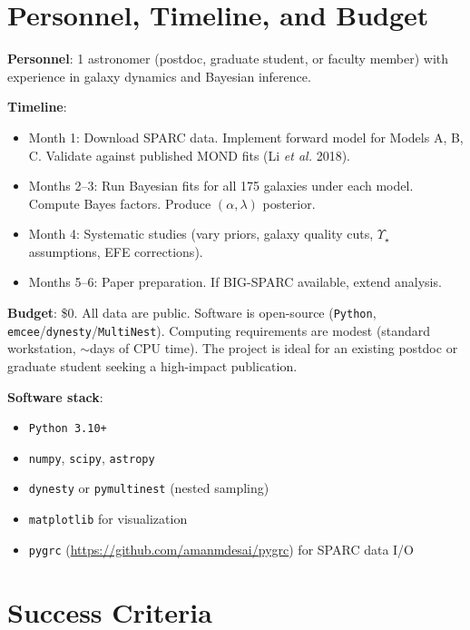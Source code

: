 \documentclass[11pt]{article}
\begin{document}
\section{Personnel, Timeline, and Budget}

\textbf{Personnel}: 1 astronomer (postdoc, graduate student, or faculty
member) with experience in galaxy dynamics and Bayesian inference.

\textbf{Timeline}:
\begin{itemize}[nosep]
\item Month 1: Download SPARC data. Implement forward model for
  Models A, B, C. Validate against published MOND fits
  (Li \textit{et al.} 2018).
\item Months 2--3: Run Bayesian fits for all 175 galaxies under each
  model. Compute Bayes factors. Produce $(\alpha, \lambda)$ posterior.
\item Month 4: Systematic studies (vary priors, galaxy quality cuts,
  $\Upsilon_\star$ assumptions, EFE corrections).
\item Months 5--6: Paper preparation. If BIG-SPARC available, extend
  analysis.
\end{itemize}

\textbf{Budget}: \$0. All data are public. Software is open-source
(\texttt{Python}, \texttt{emcee}/\texttt{dynesty}/\texttt{MultiNest}).
Computing requirements are modest (standard workstation, $\sim$days of
CPU time). The project is ideal for an existing postdoc or graduate
student seeking a high-impact publication.

\textbf{Software stack}:
\begin{itemize}[nosep]
\item \texttt{Python 3.10+}
\item \texttt{numpy}, \texttt{scipy}, \texttt{astropy}
\item \texttt{dynesty} or \texttt{pymultinest} (nested sampling)
\item \texttt{matplotlib} for visualization
\item \texttt{pygrc} (\url{https://github.com/amanmdesai/pygrc})
  for SPARC data I/O
\end{itemize}

\section{Success Criteria}
\end{document}

